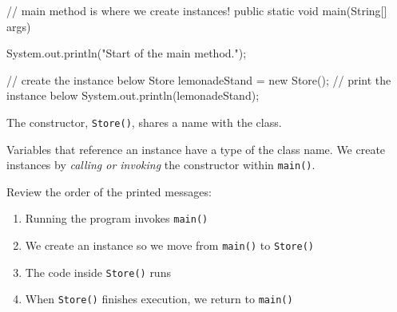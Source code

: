 \documentclass[a4paper,12pt]{article}
\begin{document}
\begin{enumerate}
\begin{javacode}
{  // main method is where we create instances!
  public static void main(String[] args) {
    System.out.println("Start of the main method.");
    
    // create the instance below
    Store lemonadeStand = new Store();
    // print the instance below
    System.out.println(lemonadeStand);
  }
}
\end{javacode}
The constructor, \verb|Store()|, shares a name with the class. 

Variables that reference an instance have a type of the class name. We create instances by \textit{calling or invoking} the constructor within \verb|main()|.

Review the order of the printed messages:
\renewcommand{\labelenumii}{$\diamond$}
\begin{enumerate}
\item Running the program invokes \verb|main()|

\item We create an instance so we move from \verb|main()| to \verb|Store()|

\item The code inside \verb|Store()| runs

\item When \verb|Store()| finishes execution, we return to \verb|main()|

\end{enumerate}


\end{enumerate}



\end{document}
